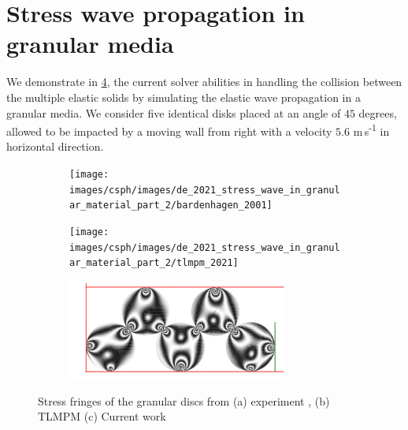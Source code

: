 \section{Stress wave propagation in granular media}
\label{sec:results-stress-wave-propagation-with-friction}
We demonstrate in \cref{fig:de-stress-wave-compare}, the current solver abilities in
handling the collision between the multiple elastic solids by simulating the
elastic wave propagation in a granular media. We consider five identical disks
placed at an angle of $45$ degrees, allowed to be impacted by a moving wall from
right with a velocity $5.6$ m\,s\textsuperscript{-1} in horizontal direction.
\begin{figure}[!htpb]
  \centering
  \begin{subfigure}{1.0\textwidth}
    \centering
    \texttt{[image: images/csph/images/de\_2021\_stress\_wave\_in\_granular\_material\_part\_2/bardenhagen\_2001]}
    \subcaption{}\label{fig:de-stress-wave-bardenhagen}
  \end{subfigure}

  \begin{subfigure}{1.0\textwidth}
    \centering
    \texttt{[image: images/csph/images/de\_2021\_stress\_wave\_in\_granular\_material\_part\_2/tlmpm\_2021]}
    \subcaption{}\label{}
  \end{subfigure}

  \begin{subfigure}{1.0\textwidth}
    \centering
    \includegraphics[width=0.8\textwidth]{figures/csph/figures/de_2021_stress_wave_in_granular_material_part_2/case_mohseni/time0}
    \subcaption{}\label{fig:de-stress-wave-current}
  \end{subfigure}
  \caption{Stress fringes of the granular discs from (a) experiment
    \citep{guilkey2001improved}, (b) TLMPM \citep{de2021modelling} (c) Current work}
\label{fig:de-stress-wave-compare}
\end{figure}

